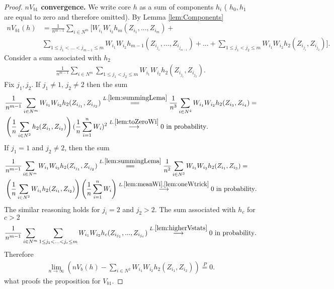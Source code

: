 \begin{proof}
\textbf{$nV_{b1}$ convergence.} We write core  $h$ as a sum of components $h_i$ ( $h_0,h_1$ are equal to zero and therefore omitted). By Lemma \ref{lem:Components}
\begin{align}
 n V_{b1}(h)& = \frac{1} {n^{m-1}}  \sum_{i \in N^m}  \Big[ W_{i_1} W_{i_2}   h_m(Z_{i_1},...,Z_{i_m})  + \\ 
 & \sum_{1 \leq j_1 < ...<j_{m-1} \leq m } W_{i_1} W_{i_2} h_{m-1}(Z_{i_{j_1}},...,Z_{i_{j_{m-1}}})   + ... + \sum_{1 \leq j_1 < j_2 \leq m } W_{i_1} W_{i_2} h_2(Z_{i_{j_1}},Z_{i_{j_2}}) \Big].
\end{align}
Consider a sum associated with $h_2$
\begin{align}
\frac{1} {n^{m-1}}  \sum_{i \in N^m}  \sum_{1 \leq j_1 < j_2 \leq m } W_{i_1} W_{i_2} h_2(Z_{i_{j_1}},Z_{i_{j_2}}).
\end{align}
Fix $j_1,j_2$. If $j_1 \neq 1$,  $j_2 \neq 2$ then the sum 
\begin{align}
\label{eq:difference}
&\frac{1} {n^{m-1}}  \sum_{i \in N^m}   W_{i_1} W_{i_2} h_2(Z_{i_{j_1}},Z_{i_{j_2}}) \overset{L.\ref{lem:summingLema}}{=\joinrel=}   \frac{1} {n^3}  \sum_{i \in N^4}   W_{i_1} W_{i_2} h_2(Z_{i_3},Z_{i_4}) = \\
& \left( \frac{1}{n}   \sum_{ i \in N^2} h_2(Z_{i_1},Z_{i_2}) \right) (\frac{1}{n} \sum_{i=1}^{n}W_i)^2 \overset{L. \ref{lem:toZeroWi}}{\longrightarrow} 0 \text{ in probability}.  
\end{align}
If $j_1 = 1$ and  $j_2 \neq 2$, then the sum  
\begin{align}
\label{eq:h2eq1}
&\frac{1} {n^{m-1}}  \sum_{i \in N^m}  W_{i_1} W_{i_2} h_2(Z_{i_{j_1}},Z_{i_{j_2}})  \overset{L.\ref{lem:summingLema}}{=\joinrel=} \frac{1} {n^2}  \sum_{i \in N^3}   W_{i_1} W_{i_3} h_2(Z_{i_1},Z_{i_3}) = \\
& \left( \frac{1}{n} \sum_{i \in N^2} W_{i_1}  h_2(Z_{i_1},Z_{i_2}) \right) \left( \frac 1 n \sum_{i=1}^{n}W_i \right) \overset{L.\ref{lem:meanWi},\ref{lem:oneWtrick}  }{\longrightarrow} 0 \text{ in probability}.
\end{align}
The similar reasoning holds for $j_i=2$ and $j_2>2$. The sum associated with $h_c$ for $c>2$
\begin{align}
\frac{1} {n^{m-1}}  \sum_{i \in N^m}  \sum_{1 \leq j_1 < ... < j_c \leq m } W_{i_1} W_{i_2} h_c(Z_{i_{j_1}},...,Z_{i_{j_c}}) \overset{L. \ref{lem:higherVstats}  }{\longrightarrow} 0  \text{ in probability}.
\end{align}
Therefore 
\begin{align}
\lim_{n \to \infty} \left( n V_b(h) - \sum_{i \in N^2} W_{i_1}W_{i_2} h_2(Z_{i_1},Z_{i_2}) \right) \overset{P}{=}0.
\end{align}
what proofs the proposition for $V_{b1}$.



\end{proof}
